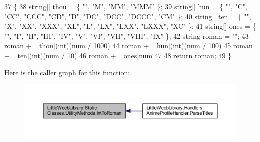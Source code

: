 \begin{DoxyCode}
37         \{
38             \textcolor{keywordtype}{string}[] thou = \{ \textcolor{stringliteral}{""}, \textcolor{stringliteral}{"M"}, \textcolor{stringliteral}{"MM"}, \textcolor{stringliteral}{"MMM"} \};
39             \textcolor{keywordtype}{string}[] hun = \{ \textcolor{stringliteral}{""}, \textcolor{stringliteral}{"C"}, \textcolor{stringliteral}{"CC"}, \textcolor{stringliteral}{"CCC"}, \textcolor{stringliteral}{"CD"}, \textcolor{stringliteral}{"D"}, \textcolor{stringliteral}{"DC"}, \textcolor{stringliteral}{"DCC"}, \textcolor{stringliteral}{"DCCC"}, \textcolor{stringliteral}{"CM"} \};
40             \textcolor{keywordtype}{string}[] ten = \{ \textcolor{stringliteral}{""}, \textcolor{stringliteral}{"X"}, \textcolor{stringliteral}{"XX"}, \textcolor{stringliteral}{"XXX"}, \textcolor{stringliteral}{"XL"}, \textcolor{stringliteral}{"L"}, \textcolor{stringliteral}{"LX"}, \textcolor{stringliteral}{"LXX"}, \textcolor{stringliteral}{"LXXX"}, \textcolor{stringliteral}{"XC"} \};
41             \textcolor{keywordtype}{string}[] ones = \{ \textcolor{stringliteral}{""}, \textcolor{stringliteral}{"I"}, \textcolor{stringliteral}{"II"}, \textcolor{stringliteral}{"III"}, \textcolor{stringliteral}{"IV"}, \textcolor{stringliteral}{"V"}, \textcolor{stringliteral}{"VI"}, \textcolor{stringliteral}{"VII"}, \textcolor{stringliteral}{"VIII"}, \textcolor{stringliteral}{"IX"} \};
42             \textcolor{keywordtype}{string} roman = \textcolor{stringliteral}{""};
43             roman += thou[(int)(num / 1000) %
44             roman += hun[(int)(num / 100) %
45             roman += ten[(int)(num / 10) %
46             roman += ones[num %
47 
48             \textcolor{keywordflow}{return} roman;
49         \}
\end{DoxyCode}
Here is the caller graph for this function\+:\nopagebreak
\begin{figure}[H]
\begin{center}
\leavevmode
\includegraphics[width=350pt]{class_little_weeb_library_1_1_static_classes_1_1_utility_methods_ab54bc5e0856652f4554fda497af655b8_icgraph}
\end{center}
\end{figure}
\mbox{\label{class_little_weeb_library_1_1_static_classes_1_1_utility_methods_a9304b6462a585dd9afa13818452638a7}} 
